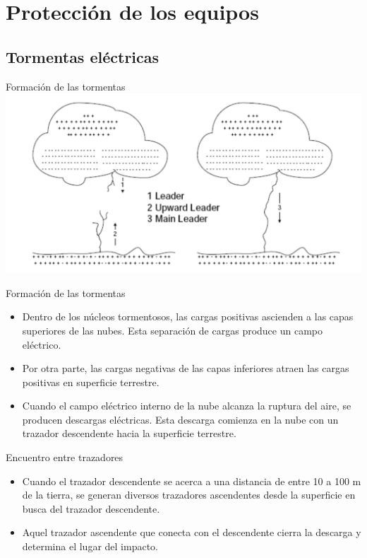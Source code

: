 \documentclass[xcolor={usenames,svgnames,dvipsnames}]{beamer}
\begin{document}
\section{Protección de los equipos}
\label{sec-4}

\subsection{Tormentas eléctricas}
\label{sec-4-1}

\begin{frame}[label=sec-4-1-1]{Formación de las tormentas}
\includegraphics[width=.9\linewidth]{../figs/FormacionTormenta.pdf}
\end{frame}

\begin{frame}[label=sec-4-1-2]{Formación de las tormentas}
\begin{itemize}
\item Dentro de los núcleos tormentosos, las cargas positivas ascienden a
las capas superiores de las nubes. Esta separación de cargas produce
un campo eléctrico.

\item Por otra parte, las cargas negativas de las capas inferiores atraen
las cargas positivas en superficie terrestre.

\item Cuando el campo eléctrico interno de la nube alcanza la ruptura del
aire, se producen descargas eléctricas. Esta descarga comienza en la
nube con un trazador descendente hacia la superficie terrestre.
\end{itemize}
\end{frame}

\begin{frame}[label=sec-4-1-3]{Encuentro entre trazadores}
\begin{itemize}
\item Cuando el trazador descendente se acerca a una distancia de entre 10
a 100 m de la tierra, se generan diversos trazadores ascendentes
desde la superficie en busca del trazador descendente.

\item Aquel trazador ascendente que conecta con el descendente cierra la
descarga y determina el lugar del impacto.
\end{itemize}
\end{frame}
\end{document}

